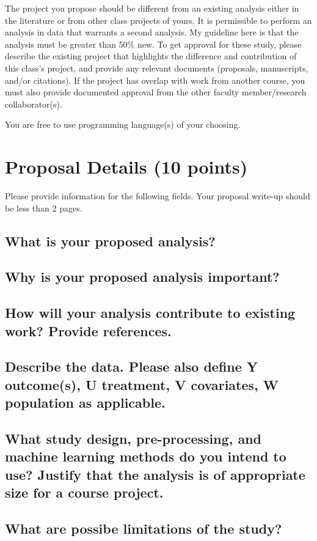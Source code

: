 \documentclass[twoside,11pt]{article}
\begin{document}
The project you propose should be different from an existing analysis either in the literature or from other class projects of yours. It is permissible to perform an analysis in data that warrants a second analysis. My guideline here is that the analysis must be greater than 50\% new. To get approval for these study, please describe the existing project that highlights the difference and contribution of this class's project, and provide any relevant documents (proposals, manuscripts, and/or citations). If the project has overlap with work from another course, you must also provide documented approval from the other faculty member/research collaborator(s). 

You are free to use programming language(s) of your choosing.

\section{Proposal Details (10 points)}
Please provide information for the following fields. Your proposal write-up should be less than 2 pages.

\subsection{What is your proposed analysis?}


\subsection{Why is your proposed analysis important?}


\subsection{How will your analysis contribute to existing work? Provide references.}


\subsection{Describe the data. Please also define Y outcome(s), U treatment, V covariates, W population as applicable.}


\subsection{What study design, pre-processing, and machine learning methods do you intend to use? Justify that the analysis is of appropriate size for a course project.}


\subsection{What are possibe limitations of the study?}



\end{document}
